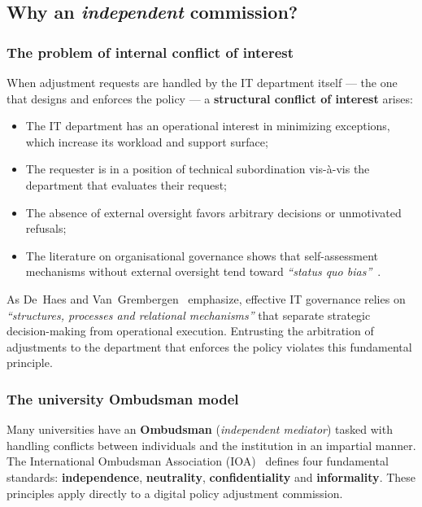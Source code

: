 \subsection{Why an \emph{independent} commission?}

\subsubsection{The problem of internal conflict of interest}

When adjustment requests are handled by the IT department
itself --- the one that designs and enforces the policy --- a
\textbf{structural conflict of interest} arises:

\begin{itemize}[nosep]
    \item The IT department has an operational interest in minimizing
    exceptions, which increase its workload and support
    surface;
    \item The requester is in a position of technical subordination
    vis-\`a-vis the department that evaluates their request;
    \item The absence of external oversight favors arbitrary decisions
    or unmotivated refusals;
    \item The literature on organisational governance shows that
    self-assessment mechanisms without external oversight tend toward
    \emph{``status quo bias''}~\cite{samuelson-zeckhauser}.
\end{itemize}

As De~Haes and Van~Grembergen~\cite{dehaes2015} emphasize, effective
IT governance relies on \emph{``structures, processes
and relational mechanisms''} that separate strategic decision-making from
operational execution. Entrusting the arbitration of adjustments to
the department that enforces the policy violates this fundamental principle.

\subsubsection{The university Ombudsman model}

Many universities have an \textbf{Ombudsman}
(\emph{independent mediator}) tasked with handling conflicts between
individuals and the institution in an impartial manner. The International
Ombudsman Association (IOA)~\cite{ioa-standards} defines four
fundamental standards: \textbf{independence}, \textbf{neutrality},
\textbf{confidentiality} and \textbf{informality}. These principles
apply directly to a digital policy adjustment commission.


